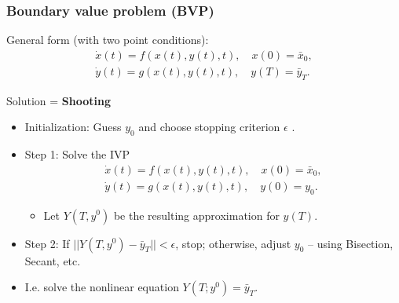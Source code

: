 \documentclass[bigger,handout]{beamer}
\newenvironment{stepitemize}{\begin{itemize}[<+->]}{\end{itemize} }
\begin{document}
 
 
\begin{frame}%
  
\frametitle{Boundary value problem (BVP)}

General form (with two point conditions): 
\begin{gather*}
\dot{x}(t)=f(x(t),y(t),t),\quad x(0)=\bar{x}_{0}, \\
\dot{y}(t)=g(x(t),y(t),t),\quad y(T)=\bar{y}_{T}.
\end{gather*}

Solution = \textbf{Shooting}

\begin{stepitemize}
\item Initialization: Guess $y_{0}$ and choose stopping criterion $\epsilon $%
.

\item Step 1: Solve the IVP 
\begin{gather*}
\dot{x}(t)=f(x(t),y(t),t),\quad x(0)=\bar{x}_{0}, \\
\dot{y}(t)=g(x(t),y(t),t),\quad y(0)=y_{0}.
\end{gather*}

\begin{itemize}
\item Let $Y(T,y^{0})$ be the resulting approximation for $y(T)$.
\end{itemize}

\item Step 2: If $||Y(T,y^{0})-\bar{y}_{T}||<\epsilon $, stop; otherwise, 
\newline
adjust $y_{0}$ -- using Bisection, Secant, etc. \medskip

\item I.e. solve the nonlinear equation $Y(T;y^{0})=\bar{y}_{T}$.
\end{stepitemize}

  
 
\end{frame}%
  
 
 
\end{document}
